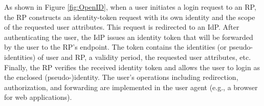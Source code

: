 As shown in Figure \ref{fig:OpenID}, when a user initiates a login request to an RP, the RP constructs an identity-token request with its own identity and the scope of the requested user attributes.
This request is redirected to an IdP.
After authenticating the user, the IdP issues an identity token that will be forwarded by the user to the RP's endpoint.
The token contains the identities (or pseudo-identities) of user and RP,
        a validity period, the requested user attributes, etc.
Finally, the RP verifies the received identity token and allows the user to login as the  enclosed (pseudo-)identity.
The user's operations including redirection, authorization, and forwarding are implemented in the user agent (e.g., a browser for web applications).




